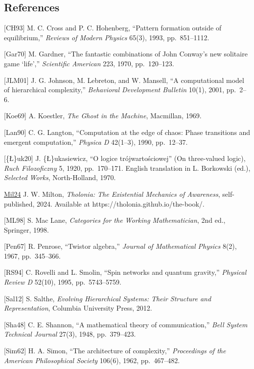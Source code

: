 \documentclass[
  11pt,
  letterpaper,
]{article}
\begin{document}
\subsection{References}\label{references}

{[}CH93{]} M. C. Cross and P. C. Hohenberg, ``Pattern formation outside
of equilibrium,'' \emph{Reviews of Modern Physics} 65(3), 1993,
pp.~851--1112.

{[}Gar70{]} M. Gardner, ``The fantastic combinations of John Conway's
new solitaire game `life','' \emph{Scientific American} 223, 1970,
pp.~120--123.

{[}JLM01{]} J. G. Johnson, M. Lebreton, and W. Mansell, ``A
computational model of hierarchical complexity,'' \emph{Behavioral
Development Bulletin} 10(1), 2001, pp.~2--6.

{[}Koe69{]} A. Koestler, \emph{The Ghost in the Machine}, Macmillan,
1969.

{[}Lan90{]} C. G. Langton, ``Computation at the edge of chaos: Phase
transitions and emergent computation,'' \emph{Physica D} 42(1--3), 1990,
pp.~12--37.

{[}\{\L\}uk20{]} J. \{\L\}ukasiewicz, ``O logice trójwartościowej'' (On
three-valued logic), \emph{Ruch Filozoficzny} 5, 1920, pp.~170--171.
English translation in L. Borkowski (ed.), \emph{Selected Works},
North-Holland, 1970.

\href{https://tholonia.github.io/the-book/}{Mil24} J. W. Milton,
\emph{Tholonia: The Existential Mechanics of Awareness}, self-published,
2024. Available at https://tholonia.github.io/the-book/.

{[}ML98{]} S. Mac Lane, \emph{Categories for the Working Mathematician},
2nd ed., Springer, 1998.

{[}Pen67{]} R. Penrose, ``Twistor algebra,'' \emph{Journal of
Mathematical Physics} 8(2), 1967, pp.~345--366.

{[}RS94{]} C. Rovelli and L. Smolin, ``Spin networks and quantum
gravity,'' \emph{Physical Review D} 52(10), 1995, pp.~5743--5759.

{[}Sal12{]} S. Salthe, \emph{Evolving Hierarchical Systems: Their
Structure and Representation}, Columbia University Press, 2012.

{[}Sha48{]} C. E. Shannon, ``A mathematical theory of communication,''
\emph{Bell System Technical Journal} 27(3), 1948, pp.~379--423.

{[}Sim62{]} H. A. Simon, ``The architecture of complexity,''
\emph{Proceedings of the American Philosophical Society} 106(6), 1962,
pp.~467--482.
\end{document}
